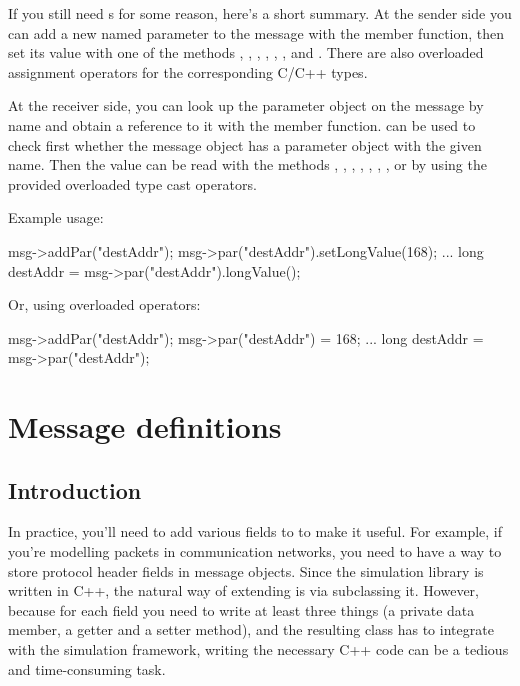 If you still need s for some reason, here's a short summary.
At the sender side you can add a new named parameter to the message
with the  member function, then set its value with
one of the methods , ,
, , ,
, and . There are also overloaded
assignment operators for the corresponding C/C++ types.

At the receiver side, you can look up the parameter object on the message
by name and obtain a reference to it with the  member function.
 can be used to check first whether the message object has a parameter
object with the given name. Then the value can be read with the methods
, , ,
, , ,
, or by using the provided overloaded type cast operators.

Example usage:

\begin{cpp}
msg->addPar("destAddr");
msg->par("destAddr").setLongValue(168);
...
long destAddr = msg->par("destAddr").longValue();
\end{cpp}

Or, using overloaded operators:

\begin{cpp}
msg->addPar("destAddr");
msg->par("destAddr") = 168;
...
long destAddr = msg->par("destAddr");
\end{cpp}


\section{Message definitions}
\label{ch:messages:message-definitions}

\subsection{Introduction}

In practice, you'll need to add various fields to  to
make it useful. For example, if you're modelling packets in communication
networks, you need to have a way to store protocol header fields in message
objects. Since the simulation library is written in C++, the natural way
of extending  is via subclassing it.
However, because for each field you need to write at least
three things (a private data member, a getter and a setter method),
and the resulting class has to integrate with the simulation framework,
writing the necessary C++ code can be a tedious and time-consuming task.

